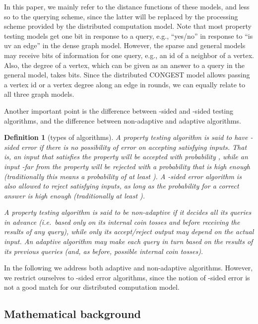 \documentclass[11pt]{article}
\newtheorem{definition}[theorem]{Definition}
\begin{document}
In this paper, we mainly refer to the distance functions of these models, and less so to the querying scheme, since the latter will be replaced by the processing scheme provided by the distributed computation model. Note that most property testing models get one bit in response to a query, e.g.,
``yes/no'' in response to ``is uv an edge'' in the dense graph model. However, the sparse and general models may receive  bits of information for one query, e.g., an id of a neighbor of a vertex. Also, the degree of a vertex, which can be given as an answer to a query in the general model, takes  bits.
Since the distributed CONGEST model allows passing a vertex id or a vertex degree along an edge in  rounds, we can equally relate to all three graph models.



Another important point is the difference between -sided and -sided testing algorithms, and the difference between non-adaptive and adaptive algorithms.

\begin{definition}[types of algorithms]
	A property testing algorithm is said to have {\em -sided error} if there is no
	possibility of error on accepting satisfying inputs. That is, an input that satisfies the
	property will be accepted with probability , while an input -far from the
	property will be rejected with a probability that is high enough (traditionally this means a
	probability of at least ). A {\em -sided  error} algorithm is also allowed to reject
	satisfying inputs, as long as the probability for a correct answer is high enough
	(traditionally at least ).
	
	A property testing algorithm is said to be {\em non-adaptive} if it decides all its queries in advance (i.e.\ based only on its internal coin tosses and before receiving the results of any query), while only its accept/reject output may depend on the actual input. An {\em adaptive} algorithm may make each query in turn based on the results of its previous queries (and, as before, possible internal coin tosses).
\end{definition}

In the following we address both adaptive and non-adaptive algorithms. However, we restrict ourselves to -sided error algorithms, since the notion of -sided error is not a good match for our distributed computation model.

\subsection{Mathematical background}
\end{document}

